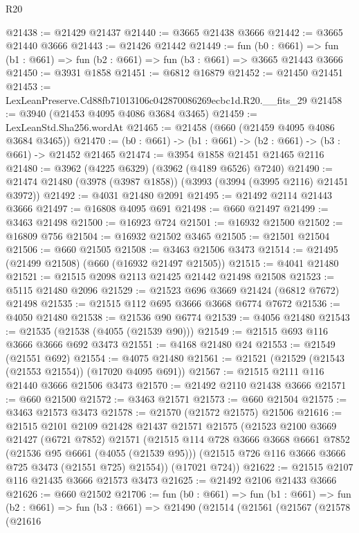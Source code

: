 \begin{lexlean}{R20}
\begin{coremodule}
@21438 := @21429 @21437
@21440 := @3665 @21438 @3666
@21442 := @3665 @21440 @3666
@21443 := @21426 @21442
@21449 := fun (b0 : @661) =>
  fun (b1 : @661) => fun (b2 : @661) => fun (b3 : @661) => @3665 @21443 @3666
@21450 := @3931 @1858
@21451 := @6812 @16879
@21452 := @21450 @21451
@21453 := LexLeanPreserve.Cd88fb71013106c042870086269ecbc1d.R20.__fits_29
@21458 := @3940 (@21453 @4095 @4086 @3684 @3465)
@21459 := LexLeanStd.Sha256.wordAt
@21465 := @21458 (@660 (@21459 @4095 @4086 @3684 @3465))
@21470 := (b0 : @661) -> (b1 : @661) -> (b2 : @661) -> (b3 : @661) -> @21452 @21465
@21474 := @3954 @1858 @21451 @21465 @2116
@21480 := @3962 (@4225 @6329) (@3962 (@4189 @6526) @7240)
@21490 := @21474 @21480 (@3978 (@3987 @1858)) (@3993 (@3994 (@3995 @2116) @21451 @3972))
@21492 := @4031 @21480 @2091
@21495 := @21492 @2114 @21443 @3666
@21497 := @16808 @4095 @691
@21498 := @660 @21497
@21499 := @3463 @21498
@21500 := @16923 @724
@21501 := @16932 @21500
@21502 := @16809 @756
@21504 := @16932 @21502 @3465
@21505 := @21501 @21504
@21506 := @660 @21505
@21508 := @3463 @21506 @3473
@21514 := @21495 (@21499 @21508) (@660 (@16932 @21497 @21505))
@21515 := @4041 @21480
@21521 := @21515 @2098 @2113 @21425 @21442 @21498 @21508
@21523 := @5115 @21480 @2096
@21529 := @21523 @696 @3669 @21424 (@6812 @7672) @21498
@21535 := @21515 @112 @695 @3666 @3668 @6774 @7672
@21536 := @4050 @21480
@21538 := @21536 @90 @6774
@21539 := @4056 @21480
@21543 := @21535 (@21538 (@4055 (@21539 @90)))
@21549 := @21515 @693 @116 @3666 @3666 @692 @3473
@21551 := @4168 @21480 @24
@21553 := @21549 (@21551 @692)
@21554 := @4075 @21480
@21561 := @21521 (@21529 (@21543 (@21553 @21554)) (@17020 @4095 @691))
@21567 := @21515 @2111 @116 @21440 @3666 @21506 @3473
@21570 := @21492 @2110 @21438 @3666
@21571 := @660 @21500
@21572 := @3463 @21571
@21573 := @660 @21504
@21575 := @3463 @21573 @3473
@21578 := @21570 (@21572 @21575) @21506
@21616 := @21515
    @2101
    @2109
    @21428
    @21437
    @21571
    @21575
    (@21523
      @2100
      @3669
      @21427
      (@6721 @7852)
      @21571
      (@21515
        @114
        @728
        @3666
        @3668
        @6661
        @7852
        (@21536 @95 @6661 (@4055 (@21539 @95)))
        (@21515 @726 @116 @3666 @3666 @725 @3473 (@21551 @725) @21554))
      (@17021 @724))
@21622 := @21515 @2107 @116 @21435 @3666 @21573 @3473
@21625 := @21492 @2106 @21433 @3666
@21626 := @660 @21502
@21706 := fun (b0 : @661) =>
  fun (b1 : @661) =>
  fun (b2 : @661) =>
  fun (b3 : @661) =>
  @21490
    (@21514
      (@21561
        (@21567
          (@21578
            (@21616

\end{coremodule}
\end{lexlean}
